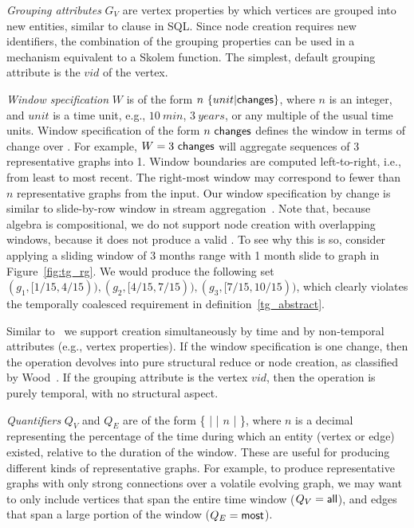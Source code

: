 {\em Grouping attributes} $G_V$ are vertex properties by which
vertices are grouped into new entities, similar to 
clause in SQL.  Since node creation requires new identifiers, the
combination of the grouping properties can be used in a mechanism
equivalent to a Skolem function.  The simplest, default grouping
attribute is the $vid$ of the vertex.

{\em Window specification} $W$ is of the form
$n~\{unit|\textsf{changes}\}$, where $n$ is an integer, and $unit$ is a
time unit, e.g., $10~min$, $3~years$, or any multiple of the usual
time units.  Window specification of the form $n~\textsf{changes}$
defines the window in terms of change over \trg.  For example,
$W=3~\textsf{changes}$ will aggregate sequences of 3 representative
graphs into 1.  Window boundaries are computed left-to-right, i.e.,
from least to most recent.  The right-most window may correspond to
fewer than $n$ representative graphs from the input.
%
Our window specification by change is similar to slide-by-row window
in stream aggregation~\cite{Li2005}.  Note that, because \tg algebra
is compositional, we do not support node creation with
overlapping windows, because it does not produce a valid \tg.  To see
why this is so, consider applying a sliding window of 3 months range
with 1 month slide to graph  in Figure~\ref{fig:tg_rg}.  We
would produce the following set $(g_1, [1/15, 4/15)), (g_2, [4/15,
    7/15)), (g_3, [7/15, 10/15))$, which clearly violates the
      temporally coalesced requirement in
      definition~\ref{tg_abstract}.  

Similar to~\cite{Li2005} we support creation simultaneously by time
and by non-temporal attributes (e.g., vertex properties).  If the
window specification is one change, then the operation devolves into
pure structural reduce or node creation, as classified by
Wood~\cite{Wood2012}.  If the grouping attribute is the vertex $vid$,
then the operation is purely temporal, with no structural aspect.

{\em Quantifiers} $Q_V$ and $Q_E$ are of the form \{  |
 |  $n$ |  \}, where $n$ is
a decimal representing the percentage of the time during which an
entity (vertex or edge) existed, relative to the duration of the
window. These are useful for producing different kinds of
representative graphs.  For example, to produce representative graphs
with only strong connections over a volatile evolving graph, we may
want to only include vertices that span the entire time window
($Q_V=\textsf{all}$), and edges that span a large portion of the window
($Q_E=\textsf{most}$).
 
